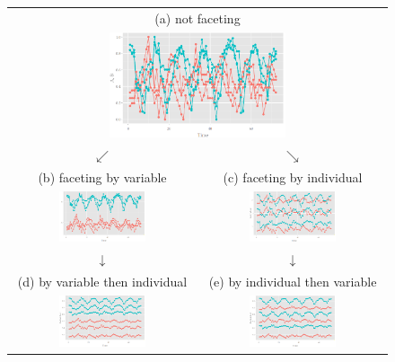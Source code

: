 \documentclass[12pt]{article}
\providecommand{\tabularnewline}{\\}
\begin{document}
\begin{itemize}
\begin{center}
\begin{figure}[H]
\begin{centering}
\begin{tabular}{cc}
\multicolumn{2}{c}{{\scriptsize{ (a) not faceting}}}\tabularnewline
\multicolumn{2}{c}{\includegraphics[width=0.48\textwidth]{graph/pipeline-14-1}}\tabularnewline
$\swarrow$ & $\searrow$\tabularnewline
{\scriptsize{ (b) faceting by variable}} & {\scriptsize{ (c) faceting by individual}}\tabularnewline
\includegraphics[width=0.48\textwidth]{graph/pipeline-14-2} & \includegraphics[width=0.48\textwidth]{graph/pipeline-14-3}\tabularnewline
$\downarrow$ & $\downarrow$\tabularnewline
{\scriptsize{ (d) by variable then individual}} & {\scriptsize{ (e) by individual then variable}}\tabularnewline
\includegraphics[width=0.48\textwidth]{graph/pipeline-14-4} & \includegraphics[width=0.48\textwidth]{graph/pipeline-14-5}\tabularnewline
\end{tabular}
\par\end{centering}


\end{figure}
\end{center}
\end{itemize}
\end{document}
